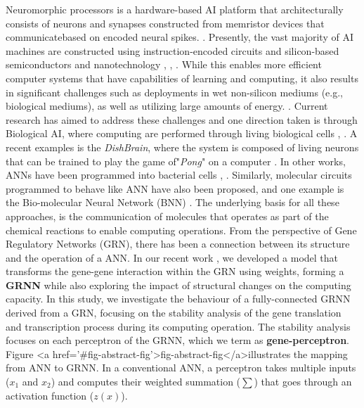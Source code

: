 \documentclass[twocolumn]{biophys-new}
\begin{document}
{{Neuromorphic processors is a hardware-based AI platform that architecturally consists of neurons and synapses constructed from memristor devices that communicatebased on encoded neural spikes. \cite{schuman2022opportunities}.
Presently, the vast majority of AI machines are constructed using instruction-encoded circuits and silicon-based semiconductors and nanotechnology \cite{nesbeth2016synthetic}, \cite{akan2016fundamentals}, \cite{akan2023internet}. While this enables more efficient computer systems that have capabilities of learning and computing, it also results in significant challenges such as deployments in wet non-silicon mediums (e.g., biological mediums), as well as utilizing large amounts of energy. 
\cite{schwenk2005training}. 
Current research has aimed to address these challenges and one direction taken is through Biological AI, where computing are performed through living biological cells \cite{balasubramaniam2023realizing}, \cite{bi2021survey}. A recent examples is the \emph{DishBrain}, where the system is composed of living neurons that can be trained to play the game of"\emph{Pong}" on a computer \cite{kagan2022vitro}. 
In other works, ANNs have been programmed into bacterial cells \cite{becerra2022computing}, \cite{li2021synthetic}.
Similarly, molecular circuits programmed to behave like ANN have also been proposed, and one example is the 
Bio-molecular Neural Network (BNN) \cite{samaniego2021signaling}.
The underlying basis for all these approaches, is the communication of molecules \cite{soldner2020survey}that operates as part of the chemical reactions to enable computing operations.
From the perspective of Gene Regulatory Networks (GRN), there has been a connection between its structure and the operation of a ANN. In our recent work \cite{somathilaka2023revealing}, we developed a model that transforms the gene-gene interaction within the GRN using weights, forming a {\bf GRNN} while also exploring the impact of structural changes on the computing capacity. 
In this study, we investigate the behaviour of a fully-connected GRNN derived from a GRN, focusing on the stability analysis of the gene translation and transcription process during its computing operation. The stability analysis focuses on each perceptron of the GRNN, which we term as \textbf{gene-perceptron}. Figure <a href='#fig-abstract-fig'>fig-abstract-fig</a>illustrates the mapping from ANN to GRNN. 
In a conventional ANN, a perceptron takes multiple inputs ($x_1$ and $x_2$) and computes their weighted summation ($\sum$) that goes through an activation function ($z(x)$). 
}}
\end{document}
